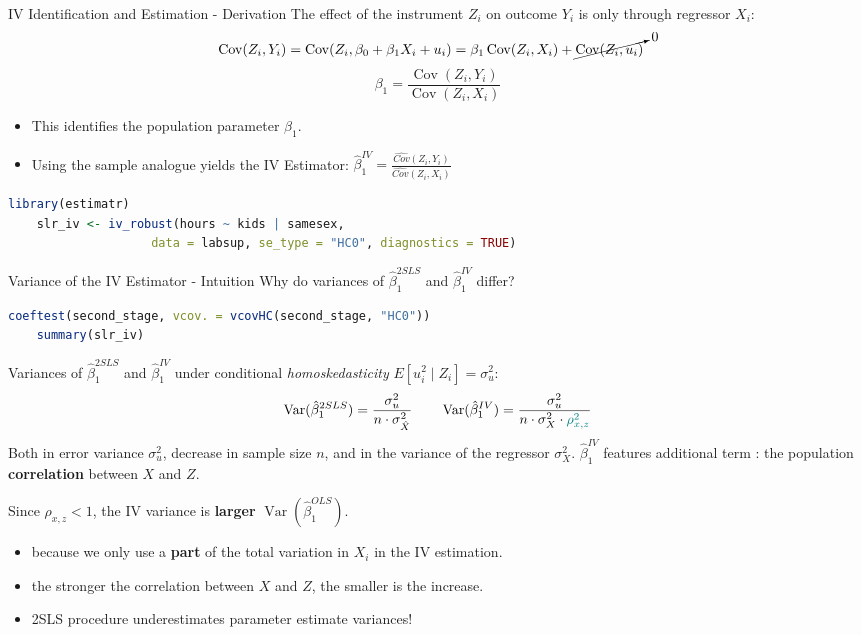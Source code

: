 \documentclass[11pt, aspectratio = 169]{beamer}
\begin{document}
\begin{frame}[fragile]{IV Identification and Estimation - Derivation}
The effect of the instrument $Z_i$ on outcome $Y_i$ is only through regressor $X_i$:
\begin{align*}
\operatorname{Cov}(Z_i, Y_i)
    &= \operatorname{Cov}(Z_i, \beta_0 + \beta_1 X_i + u_i) = \beta_1 \operatorname{Cov}(Z_i, X_i)
       + \cancelto{0}{\operatorname{Cov}(Z_i, u_i)} 
\end{align*}
\[\beta_1 = \frac{\operatorname{Cov}(Z_i, Y_i)}{\operatorname{Cov}(Z_i, X_i)}\]
\pause 
\vspace{-6mm}
\begin{itemize}
    \item This identifies the population parameter $\beta_1$.
    \item Using the sample analogue yields the \alert{IV Estimator}: $\hat{\beta}_1^{IV} = \frac{\widehat{Cov}(Z_i, Y_i)}{\widehat{Cov}(Z_i, X_i)}$
\end{itemize}
\vspace{3mm}
\pause
\begin{lstlisting}[language=R]
    library(estimatr)
    slr_iv <- iv_robust(hours ~ kids | samesex, 
                    data = labsup, se_type = "HC0", diagnostics = TRUE)
\end{lstlisting}
\end{frame}

\begin{frame}[fragile]{Variance of the IV Estimator - Intuition}
Why do variances of $\hat\beta_1^{2SLS}$ and $\hat\beta_1^{IV}$ differ?
\begin{lstlisting}[language=R]
    coeftest(second_stage, vcov. = vcovHC(second_stage, "HC0")) 
    summary(slr_iv)
\end{lstlisting}
\pause
Variances of $\hat\beta_1^{2SLS}$ and $\hat\beta_1^{IV}$ 
under conditional \emph{homoskedasticity} $E[u_i^2 \mid Z_i] = \sigma_u^2$:
\vspace{-1.5mm}
\[
\operatorname{Var}(\hat\beta_1^{2SLS}) 
    = \frac{\sigma_u^2}{n \cdot \sigma_{\hat X}^2}
\qquad
\operatorname{Var}(\hat\beta_1^{IV}) 
    = \frac{\sigma_u^2}{n \cdot \sigma_X^2 \cdot \textcolor{teal}{\rho_{x,z}^2}}
\]
Both in error variance $\sigma_u^2$,
decrease in sample size $n$, and in the variance of the regressor $\sigma_X^2$. 
\pause $\hat\beta_1^{IV}$ features additional term \color{black}: the population \textbf{correlation} between $X$ and $Z$.

Since $\rho_{x,z} < 1$, the IV variance is \textbf{\alert{larger}}
$\operatorname{Var}(\hat\beta_1^{OLS})$.

\begin{itemize}
    \item because we only use a \textbf{part} of the total variation in $X_i$ in the IV estimation.
    \item the stronger the correlation between $X$ and $Z$, the smaller is the increase.
    \item[$\rightarrow$] 2SLS procedure underestimates parameter estimate variances!
\end{itemize}

\end{frame}
\end{document}
